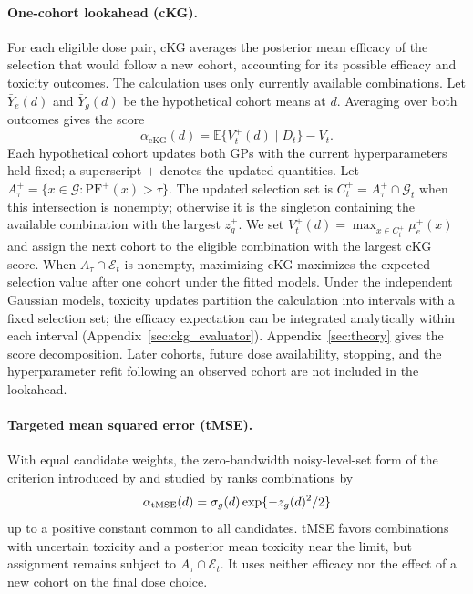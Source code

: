 \documentclass[11pt]{article}
\newcommand{\rev}[1]{{#1}}
\newcommand{\revisioncolor}{}
\newcommand{\PF}{\mathrm{PF}}
\begin{document}
\paragraph{One-cohort lookahead (cKG).} \rev{For each eligible dose pair, cKG averages the posterior mean efficacy of the selection that would follow a new cohort, accounting for its possible efficacy and toxicity outcomes. The calculation uses only currently available combinations. Let $\bar Y_e(d)$ and $\bar Y_g(d)$ be the hypothetical cohort means at $d$. Averaging over both outcomes gives the score}
\begin{equation}\label{eq:kg}
\revisioncolor
\alpha_{\mathrm{cKG}}(d)=\mathbb E\{V_t^+(d)\mid D_t\}-V_t.
\end{equation}
\rev{Each hypothetical cohort updates both GPs with the current hyperparameters held fixed; a superscript $+$ denotes the updated quantities. Let $A_\tau^+=\{x\in\mathcal G:\PF^+(x)>\tau\}$. The updated selection set is $C_t^+=A_\tau^+\cap\mathcal G_t$ when this intersection is nonempty; otherwise it is the singleton containing the available combination with the largest $z_g^+$. We set $V_t^+(d)=\max_{x\in C_t^+}\mu_e^+(x)$ and assign the next cohort to the eligible combination with the largest cKG score.} \rev{When $A_\tau\cap\mathcal E_t$ is nonempty, maximizing cKG maximizes the expected selection value after one cohort under the fitted models.} Under the independent Gaussian models, toxicity updates partition the calculation into intervals with a fixed selection set; the efficacy expectation can be integrated analytically within each interval (Appendix~\ref{sec:ckg_evaluator}). \rev{Appendix~\ref{sec:theory} gives the score decomposition.} Later cohorts, future dose availability, stopping, and the hyperparameter refit following an observed cohort are not included in the lookahead.

\paragraph{Targeted mean squared error (tMSE).} With equal candidate weights, the zero-bandwidth noisy-level-set form of the criterion introduced by \citet{picheny2010} and studied by \citet{lyu2021} ranks combinations by
\begin{equation}\label{eq:tmse}
\rev{\alpha_{\rm tMSE}}(d)=\sigma_g(d)\exp\{-z_g(d)^2/2\}
\end{equation}
up to a positive constant common to all candidates. tMSE favors combinations with uncertain toxicity and \rev{a posterior mean toxicity near the limit}, but assignment remains subject to $A_\tau\cap\mathcal E_t$. It uses neither efficacy nor the effect of a new cohort on the final dose choice.
\end{document}
